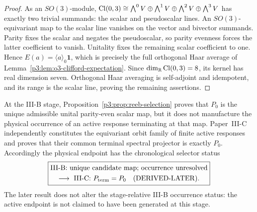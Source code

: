 \documentclass[12pt,a4paper]{article}
\begin{document}
\begin{proof}
As an \(SO(3)\)-module, \(\operatorname{Cl}(0,3)\cong
\bigwedge^0V\oplus\bigwedge^1V\oplus\bigwedge^2V\oplus\bigwedge^3V\)
has exactly two trivial summands: the scalar and pseudoscalar lines.  An
\(SO(3)\)-equivariant map to the scalar line vanishes on the vector and
bivector summands.  Parity fixes the scalar and negates the pseudoscalar, so
parity evenness forces the latter coefficient to vanish.  Unitality fixes the
remaining scalar coefficient to one.  Hence
\(E(a)=\langle a\rangle_0\mathbf1\), which is precisely the
full orthogonal Haar average of
Lemma~\ref{p3:lem:o3-clifford-expectation}.  Since
\(\dim_{\mathbb R}\operatorname{Cl}(0,3)=8\), its kernel has real dimension seven.
Orthogonal Haar averaging is self-adjoint and idempotent, and its range is the
scalar line, proving the remaining assertions.
\end{proof}

\begin{remark}
\label{p3b:rem:infrared-derived-later}
At the III-B stage, Proposition~\ref{p3:prop:reeb-selection} proves that
\(P_0\) is the unique admissible unital parity-even scalar map, but it does
not manufacture the physical occurrence of an active response terminating at
that map.  Paper~III-C independently constitutes the equivariant orbit family
of finite active responses and proves that their common terminal spectral
projector is exactly \(P_0\).
Accordingly the physical endpoint has the chronological selector status
\[
 \boxed{\begin{gathered}
 \text{III-B: unique candidate map; occurrence unresolved}\\
 \longrightarrow\ \text{III-C: }P_{\rm term}=P_0
 \quad(\mathrm{DERIVED\text{-}LATER}).
 \end{gathered}}
\]
The later result does not alter the stage-relative III-B occurrence status:
the active endpoint is not claimed to have been generated at this stage.
\end{remark}
\end{document}
